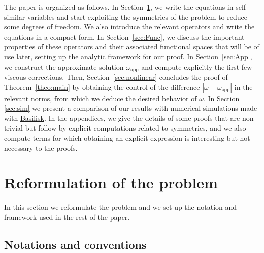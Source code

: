 \documentclass[11pt,reqno,a4paper]{amsart}
\newcommand{\app}{\mathrm{app}}
\newcommand{\1}{\mathbbm{1}}
\theoremstyle{definition}
\theoremstyle{definition}
\numberwithin{equation}{section}
\begin{document}
The paper is organized as follows. In Section~\ref{sec:eq}, we write the equations in self-similar variables and start exploiting the symmetries of the problem to reduce some degrees of freedom. We also introduce the relevant operators and write the equations in a compact form. In Section~\ref{sec:Func}, we discuss the important properties of these operators and their associated functional spaces that will be of use later, setting up the analytic framework for our proof. In Section~\ref{sec:App}, we construct the approximate solution $\omega_\app$ and compute explicitly the first few viscous corrections. Then, Section~\ref{sec:nonlinear} concludes the proof of Theorem~\ref{theo:main} by obtaining the control of the difference $|\omega-\omega_{\app}|$ in the relevant norms, from which we deduce the desired behavior of $\omega$. In Section \ref{sec:sim} we present a comparison of our results with numerical simulations made with \href{http://basilisk.fr/}{Basilisk}. 
In the appendices, we give the details of some proofs that are non-trivial but follow by explicit computations related  to symmetries, and  we also compute terms for which obtaining an explicit expression is interesting but not necessary to the proofs. 



\section{Reformulation of the problem}\label{sec:eq}
In this section we reformulate the problem and we set up the notation and framework used in the rest of the paper. 
\subsection{Notations and conventions}
\end{document}
